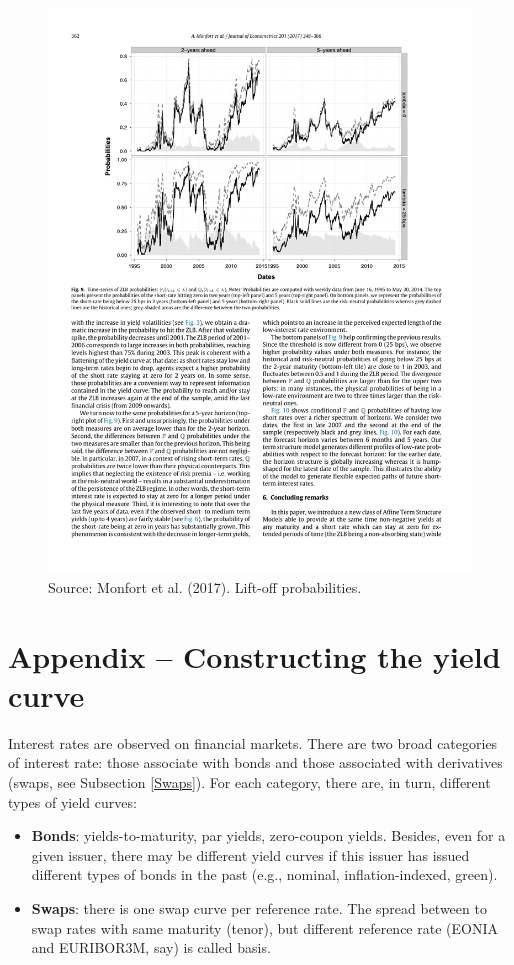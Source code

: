 \documentclass[
  12pt,
]{book}
\providecommand{\tightlist}{%
  \setlength{\itemsep}{0pt}\setlength{\parskip}{0pt}}
\theoremstyle{definition}
\theoremstyle{definition}
\theoremstyle{definition}
\theoremstyle{definition}
\theoremstyle{remark}
\begin{document}
\begin{figure}

{\centering \includegraphics[width=0.95\linewidth]{figures/Figure_LiftOff} 

}

\caption{Source: Monfort et al. (2017). Lift-off probabilities.}\label{fig:liftOff}
\end{figure}

\hypertarget{constructing}{%
\section{Appendix -- Constructing the yield curve}\label{constructing}}

Interest rates are observed on financial markets. There are two broad categories of interest rate: those associate with bonds and those associated with derivatives (swaps, see Subsection \ref{Swaps}). For each category, there are, in turn, different types of yield curves:

\begin{itemize}
\tightlist
\item
  \textbf{Bonds}: yields-to-maturity, par yields, zero-coupon yields. Besides, even for a given issuer, there may be different yield curves if this issuer has issued different types of bonds in the past (e.g., nominal, inflation-indexed, green).
\item
  \textbf{Swaps}: there is one swap curve per reference rate. The spread between to swap rates with same maturity (tenor), but different reference rate (EONIA and EURIBOR3M, say) is called basis.
\end{itemize}
\end{document}
